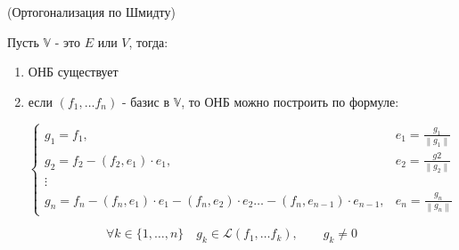 \begin{shth}
    \begin{theorem}
        (Ортогонализация по Шмидту)
        
        Пусть $\mathbb{V}$ - это $E$ или $V$, тогда:
        \begin{enumerate}
            \item ОНБ существует
            \item если ${(f_{1}, \ldots f_{n})}$ - базис в $\mathbb{V}$, то ОНБ можно построить по формуле:
            
            \[
            \begin{cases}
                g_{1} = f_{1}, & e_{1} = \frac{g_{1}}{\left\|g_{1}\right\|} \\
                g_{2} = f_{2} - \left(f_{2}, e_{1}\right) \cdot e_{1}, & e_{2} = \frac{g{2}}{\left\|g_{2}\right\|} \\
                \vdots \\
                g_{n} = f_{n} - \left(f_{n}, e_{1}\right) \cdot e_{1} - \left(f_{n}, e_{2}\right) \cdot e_{2} \ldots - \left(f_{n}, e_{n-1}\right) \cdot e_{n-1}, & e_{n} = \frac{g_{n}}{\left\|g_{n}\right\|}
            \end{cases}
            \]
        \end{enumerate}
    \end{theorem}
\end{shth}

\clearpage

\begin{shth}
    \begin{lemma}
        \[ \forall k \in {\{1, \ldots, n \}} \quad g_{k} \in \mathcal{L}(f_{1}, \ldots f_{k}), \qquad g_{k} \neq 0 \]
    \end{lemma}
\end{shth}


